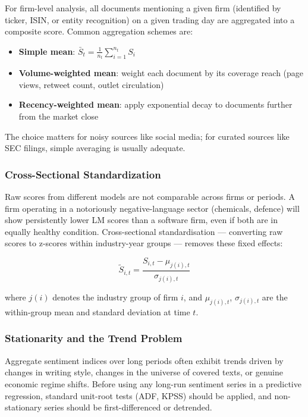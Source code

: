 For firm-level analysis, all documents mentioning a given firm (identified by ticker, ISIN, or entity recognition) on a given trading day are aggregated into a composite score. Common aggregation schemes are:

\begin{itemize}
  \item \textbf{Simple mean}: $\bar{S}_t = \frac{1}{n_t} \sum_{i=1}^{n_t} S_i$
  \item \textbf{Volume-weighted mean}: weight each document by its coverage reach (page views, retweet count, outlet circulation)
  \item \textbf{Recency-weighted mean}: apply exponential decay to documents further from the market close
\end{itemize}

The choice matters for noisy sources like social media; for curated sources like SEC filings, simple averaging is usually adequate.

\subsubsection*{Cross-Sectional Standardization}

Raw scores from different models are not comparable across firms or periods. A firm operating in a notoriously negative-language sector (chemicals, defence) will show persistently lower LM scores than a software firm, even if both are in equally healthy condition. Cross-sectional standardisation --- converting raw scores to z-scores within industry-year groups --- removes these fixed effects:

\begin{equation}
  \label{eq:zscore-sentiment}
  \tilde{S}_{i,t} = \frac{S_{i,t} - \mu_{j(i),t}}{\sigma_{j(i),t}}
\end{equation}

where $j(i)$ denotes the industry group of firm $i$, and $\mu_{j(i),t}$, $\sigma_{j(i),t}$ are the within-group mean and standard deviation at time $t$.

\subsubsection*{Stationarity and the Trend Problem}

Aggregate sentiment indices over long periods often exhibit trends driven by changes in writing style, changes in the universe of covered texts, or genuine economic regime shifts. Before using any long-run sentiment series in a predictive regression, standard unit-root tests (ADF, KPSS) should be applied, and non-stationary series should be first-differenced or detrended.

